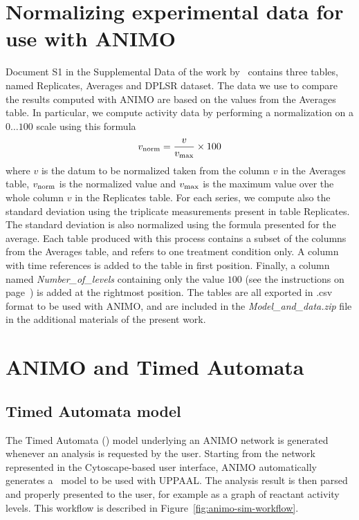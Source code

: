 \section{Normalizing experimental data for use with ANIMO}\label{suppl-sec:normalization}
Document S1 in the Supplemental Data of the work by~\citet{pathway-autocrine} contains
three tables, named {\sf Replicates}, {\sf Averages} and {\sf DPLSR dataset}.
The data we use to compare the results computed with ANIMO are based on the
values from the {\sf Averages} table.
In particular, we compute activity data by performing a normalization on a $0\dots 100$ scale using this formula
$$
v_{\mbox{\scriptsize norm}} = \frac{v}{v_{\mbox{\scriptsize max}}} \times 100
$$
where $v$ is the datum to be normalized taken from the column $v$ in the {\sf Averages} table,
$v_{\mbox{\scriptsize norm}}$ is the normalized value and
$v_{\mbox{\scriptsize max}}$ is the maximum value over the whole column $v$ in the {\sf Replicates} table.
For each series, we compute also the standard deviation using the triplicate measurements
present in table {\sf Replicates}. The standard deviation is also normalized using the formula presented for the average.
Each table produced with this process contains a subset of the columns from the {\sf Averages} table,
and refers to one treatment condition only. A column with time references is added to the table in first position.
Finally, a column named \emph{Number\_of\_levels} containing only the value $100$ (see the instructions
on page~\pageref{csv-import-format}) is added at the rightmost position.
The tables are all exported in .csv format to be used with ANIMO, and are included in the \emph{Model\_and\_data.zip}
file in the additional materials of the present work.


\clearpage
\section{ANIMO and Timed Automata}\label{suppl-sec:animo-ta}

\subsection{Timed Automata model}
The Timed Automata (\tas) model underlying an ANIMO network is generated whenever an analysis is requested by the user.
Starting from the network represented in the Cytoscape-based user interface, ANIMO automatically generates a \tas\ model
to be used with UPPAAL. The analysis result is then parsed and properly presented to the user, for example
as a graph of reactant activity levels. This workflow is described in Figure~\ref{fig:animo-sim-workflow}.

